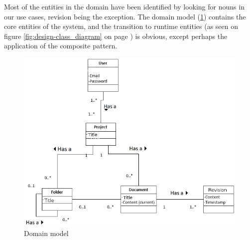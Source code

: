 Most of the entities in the \SOP{} domain have been identified by looking for nouns in our use cases, revision being the exception.
The domain model (\ref{fig:domain-model}) contains the core entities of the \SOP{} system, and the transition to runtime entities (as seen on figure \ref{fig:design-class_diagram} on page \pageref{fig:design-class_diagram}) is obvious, except perhaps the application of the composite pattern.
\begin{figure}[H]
	\centering
	\includegraphics[width=1\textwidth]{Software_analysis/graphics/Domain_model.png}
	\caption{Domain model}
	\label{fig:domain-model}
\end{figure}
	